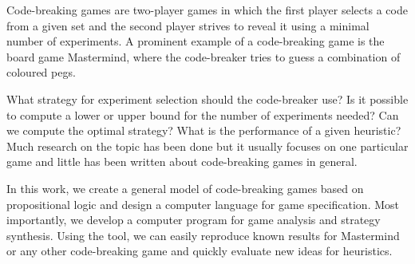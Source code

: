 \begin{ThesisAbstract}
Code-breaking games are two-player games in which the first player selects
  a code from a given set and the second player strives to reveal it using a
  minimal number of experiments.
A prominent example of a code-breaking game is the board game Mastermind,
  where the code-breaker tries to guess a combination of coloured pegs.

What strategy for experiment selection should the code-breaker use?
Is it possible to compute a lower or upper bound for the number of experiments needed?
Can we compute the optimal strategy?
What is the performance of a given heuristic?
Much research on the topic has been done but it usually focuses
  on one particular game and little has been written about code-breaking
  games in general.

In this work, we create a general model of code-breaking games
  based on propositional logic
  and design a computer language for game specification.
Most importantly, we develop a computer program for game analysis
  and strategy synthesis.
Using the tool, we can easily reproduce known results for Mastermind or
  any other code-breaking game and quickly evaluate new ideas
  for heuristics.
\end{ThesisAbstract}

\MainMatter
\setlength{\parindent}{0pt}

\setcounter{secnumdepth}{1}
\setcounter{tocdepth}{2}
\begin{spacing}{1.2} \normalsize
\tableofcontents
\end{spacing}










\pagestyle{plain}
\printbibliography

\begin{appendices}

\end{appendices}



